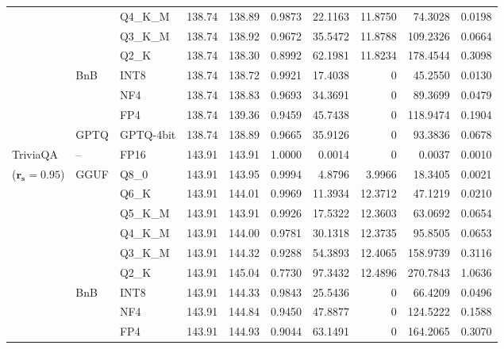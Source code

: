 \begin{longtable}{ll l rrrrrrr}
 &  & Q4\_K\_M & 138.74 & 138.89 & 0.9873 & 22.1163 & 11.8750 & 74.3028 & 0.0198 \\
 &  & Q3\_K\_M & 138.74 & 138.92 & 0.9672 & 35.5472 & 11.8788 & 109.2326 & 0.0664 \\
 &  & Q2\_K & 138.74 & 138.30 & \cellcolor{red!18} 0.8992 & \cellcolor{red!18} 62.1981 & 11.8234 & \cellcolor{red!18} 178.4544 & \cellcolor{red!18} 0.3098 \\
 & BnB & INT8 & 138.74 & 138.72 & 0.9921 & 17.4038 & \cellcolor{cyan!12} $0$ & 45.2550 & 0.0130 \\
 &  & NF4 & 138.74 & 138.83 & 0.9693 & 34.3691 & \cellcolor{cyan!12} $0$ & 89.3699 & 0.0479 \\
 &  & FP4 & 138.74 & 139.36 & \cellcolor{red!18} 0.9459 & \cellcolor{red!18} 45.7438 & \cellcolor{cyan!12} $0$ & \cellcolor{red!18} 118.9474 & \cellcolor{red!18} 0.1904 \\
 & GPTQ & GPTQ-4bit & 138.74 & 138.89 & 0.9665 & 35.9126 & \cellcolor{cyan!12} $0$ & 93.3836 & 0.0678 \\
\midrule
TriviaQA & -- & FP16 & 143.91 & 143.91 & 1.0000 & 0.0014 & \cellcolor{cyan!12} $0$ & 0.0037 & 0.0010 \\
{\small ($\mathbf{r_s{=}0.95}$)} & GGUF & Q8\_0 & 143.91 & 143.95 & 0.9994 & 4.8796 & 3.9966 & 18.3405 & 0.0021 \\
 &  & Q6\_K & 143.91 & 144.01 & 0.9969 & 11.3934 & 12.3712 & 47.1219 & 0.0210 \\
 &  & Q5\_K\_M & 143.91 & 143.91 & 0.9926 & 17.5322 & 12.3603 & 63.0692 & 0.0654 \\
 &  & Q4\_K\_M & 143.91 & 144.00 & 0.9781 & 30.1318 & 12.3735 & 95.8505 & 0.0653 \\
 &  & Q3\_K\_M & 143.91 & 144.32 & \cellcolor{red!18} 0.9288 & \cellcolor{red!18} 54.3893 & 12.4065 & \cellcolor{red!18} 158.9739 & \cellcolor{red!18} 0.3116 \\
 &  & Q2\_K & 143.91 & 145.04 & \cellcolor{red!35} 0.7730 & \cellcolor{red!35} 97.3432 & 12.4896 & \cellcolor{red!35} 270.7843 & \cellcolor{red!35} 1.0636 \\
 & BnB & INT8 & 143.91 & 144.33 & 0.9843 & 25.5436 & \cellcolor{cyan!12} $0$ & 66.4209 & 0.0496 \\
 &  & NF4 & 143.91 & 144.84 & \cellcolor{red!18} 0.9450 & \cellcolor{red!18} 47.8877 & \cellcolor{cyan!12} $0$ & \cellcolor{red!18} 124.5222 & \cellcolor{red!18} 0.1588 \\
 &  & FP4 & 143.91 & 144.93 & \cellcolor{red!18} 0.9044 & \cellcolor{red!18} 63.1491 & \cellcolor{cyan!12} $0$ & \cellcolor{red!18} 164.2065 & \cellcolor{red!18} 0.3070 \\

\end{longtable}
